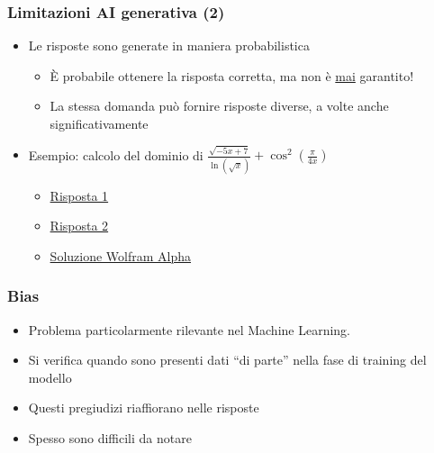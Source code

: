 \begin{contentframe}
    \frametitle{Limitazioni AI generativa (2)}

    \begin{itemize}
        \item Le risposte sono generate in maniera probabilistica
        \begin{itemize}
            \item È probabile ottenere la risposta corretta, ma non è \underline{mai} garantito!
            \item La stessa domanda può fornire risposte diverse, a volte anche significativamente
        \end{itemize}

        \bigskip
        \item Esempio: calcolo del dominio di $\frac{\sqrt{-5x + 7}}{\ln(\sqrt{x})} + \cos^2\left(\frac{\pi}{4x}\right)$
        \begin{itemize}
            \item \href{https://chatgpt.com/share/6776910a-2990-8003-a158-e9337a55edf2}{Risposta 1}
            \item \href{https://chatgpt.com/share/67769686-f368-8003-b862-005258d4ba3a}{Risposta 2}
            \item \href{https://www.wolframalpha.com/input?i2d=true&i=Divide\%5BSqrt\%5B-5x\%2B7\%5D\%2Cln\%5C\%2840\%29Sqrt\%5Bx\%5D\%5C\%2841\%29\%5D\%2BSquare\%5Bcos\%5C\%2840\%29Divide\%5B\%CF\%80\%2C4x\%5D\%5C\%2841\%29\%5Ddomain}{Soluzione Wolfram Alpha}
        \end{itemize}

    \end{itemize}
\end{contentframe}


\begin{contentframe}
    \frametitle{Bias}

    \begin{itemize}
        \item Problema particolarmente rilevante nel Machine Learning.

        \bigskip
        \item Si verifica quando sono presenti dati ``di parte'' nella fase di training del modello

        \bigskip
        \item Questi pregiudizi riaffiorano nelle risposte
        \item Spesso sono difficili da notare
    \end{itemize}
\end{contentframe}

